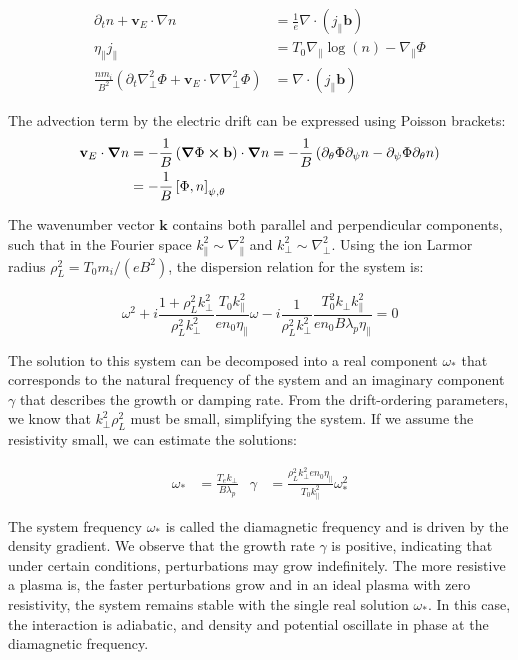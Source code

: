 \begin{align}
	\partial_t n + \mathbf{v}_E \cdot \nabla n &= \frac{1}{e} \nabla \cdot (j_\parallel \mathbf{b}) \\
	\eta_\parallel j_\parallel &= T_0 \nabla_\parallel \log(n) - \nabla_\parallel \Phi \\
	\frac{nm_i}{B^2} \left(\partial_t \nabla_\perp^2 \Phi + \mathbf{v}_E \cdot \nabla \nabla_\perp^2 \Phi\right) &= \nabla \cdot (j_\parallel \mathbf{b})
\end{align}

The advection term by the electric drift can be expressed using Poisson brackets:
\begin{align}
	\mathbf{v}_E\cdot\grad n &= -\frac{1}{B}\left(\grad\Phi\cross \mathbf{b} \right)\cdot\grad n = -\frac{1}{B} \left(\partial_\theta\Phi \partial_\psi n - \partial_\psi\Phi \partial_\theta n\right) \nonumber \\ 
	&= -\frac{1}{B}\left[\Phi,n\right]_{\psi,\theta} \label{eq:edge_poissonBracket}
\end{align}

The wavenumber vector $ \mathbf{k} $ contains both parallel and perpendicular components, such that in the Fourier space $ k_\parallel^2 \sim \nabla_\parallel^2 $ and $ k_\perp^2 \sim \nabla_\perp^2 $. Using the ion Larmor radius $\rho_L^2 = T_0m_i/(eB^2)$, the dispersion relation for the system is: 

\begin{equation}
	\omega^2 + i\frac{1 + \rho_L^2k_\perp^2}{\rho_L^2k_\perp^2}\frac{T_0k_\parallel^2}{en_0\eta_\parallel}\omega - i\frac{1}{\rho_L^2k_\perp^2}\frac{T_0^2k_\perp k_\parallel^2}{en_0B\lambda_p\eta_\parallel} = 0
\end{equation}


The solution to this system can be decomposed into a real component $ \omega_* $ that corresponds to the natural frequency of the system and an imaginary component $ \gamma $ that describes the growth or damping rate. From the drift-ordering parameters, we know that $ k_\perp^2 \rho_L^2 $ must be small, simplifying the system. If we assume the resistivity small, we can estimate the solutions:

\begin{align}
	\omega_* &= \frac{T_e k_\perp}{B\lambda_p} & \gamma &= \frac{\rho_L^2k_\perp^2en_0\eta_\parallel}{T_0k_\parallel^2}\omega_*^2
\end{align}

The system frequency $ \omega_* $ is called the diamagnetic frequency and is driven by the density gradient. We observe that the growth rate $ \gamma $ is positive, indicating that under certain conditions, perturbations may grow indefinitely. The more resistive a plasma is, the faster perturbations grow and in an ideal plasma with zero resistivity, the system remains stable with the single real solution $\omega_*$. In this case, the interaction is adiabatic, and density and potential oscillate in phase at the diamagnetic frequency.


